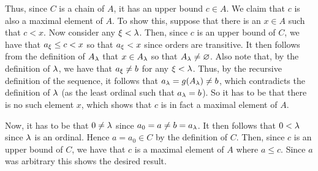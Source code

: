 {{    Thus, since $C$ is a chain of $A$, it has an upper bound $c \in A$.
    We claim that $c$ is also a maximal element of $A$.
    To show this, suppose that there is an $x \in A$ such that $c < x$.
    Now consider any $\xi < \lambda$.
    Then, since $c$ is an upper bound of $C$, we have that $a_\xi \leq c < x$ so that $a_\xi < x$ since orders are transitive.
    It then follows from the definition of $A_\lambda$ that $x \in A_\lambda$ so that $A_\lambda \neq \varnothing$.
    Also note that, by the definition of $\lambda$, we have that $a_\xi \neq b$ for any $\xi < \lambda$.
    Thus, by the recursive definition of the sequence, it follows that $a_\lambda = g(A_\lambda) \neq b$, which contradicts the definition of $\lambda$ (as the least ordinal such that $a_\lambda = b$).
    So it has to be that there is no such element $x$, which shows that $c$ is in fact a maximal element of $A$.

    Now, it has to be that $0 \neq \lambda$ since $a_0 = a \neq b = a_\lambda$.
    It then follows that $0 < \lambda$ since $\lambda$ is an ordinal.
    Hence $a = a_0 \in C$ by the definition of $C$.
    Then, since $c$ is an upper bound of $C$, we have that $c$ is a maximal element of $A$ where $a \leq c$.
    Since $a$ was arbitrary this shows the desired result.
  }
}

